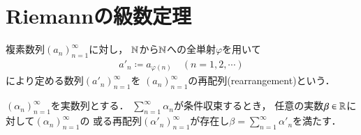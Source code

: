 \chapter{Riemannの級数定理\label{chap:Riemann_series}}

	複素数列$(a_n)_{n=1}^{\infty}$に対し，
	$\mathbb{N}$から$\mathbb{N}$への全単射$\varphi$を用いて
	\begin{align}
		a'_n \coloneqq a_{\varphi(n)} \quad (n=1,2,\cdots)
	\end{align}
	により定める数列$\left( a'_n \right)_{n=1}^{\infty}$を
	$(a_n)_{n=1}^{\infty}$の再配列(rearrangement)という．
	
	\begin{screen}
		\begin{thm}[Riemannの級数定理]
			$(\alpha_n)_{n=1}^{\infty}$を実数列とする．
			$\sum_{n=1}^{\infty} \alpha_n$が条件収束するとき，
			任意の実数$\beta \in \mathbb{R}$に対して$(\alpha_n)_{n=1}^{\infty}$の
			或る再配列$(\alpha'_n)_{n=1}^{\infty}$が存在し$\beta = \sum_{n=1}^{\infty} \alpha'_n$を満たす．
			\label{thm:Riemann_series}
		\end{thm}
	\end{screen}
	
